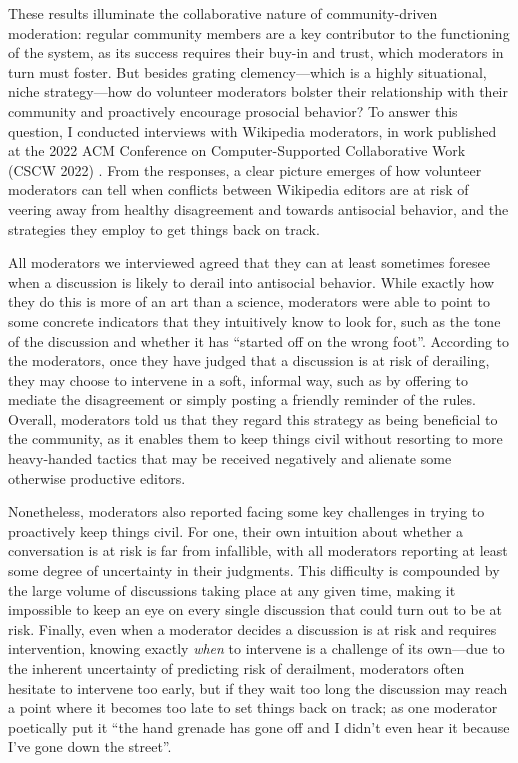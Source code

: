 \documentclass[11pt,letterpaper]{article}
\begin{document}
These results illuminate the collaborative nature of community-driven moderation: regular community members are a key contributor to the functioning of the system, as its success requires their buy-in and trust, which moderators in turn must foster.
But besides grating clemency---which is a highly situational, niche strategy---how do volunteer moderators bolster their relationship with their community and proactively encourage prosocial behavior?
To answer this question, I conducted interviews with Wikipedia moderators, in work published at the 2022 ACM Conference on Computer-Supported Collaborative Work (CSCW 2022) \cite{schluger_proactive_2022}.
From the responses, a clear picture emerges of how volunteer moderators can tell when conflicts between Wikipedia editors are at risk of veering away from healthy disagreement and towards antisocial behavior, and the strategies they employ to get things back on track.

All moderators we interviewed agreed that they can at least sometimes foresee when a discussion is likely to derail into antisocial behavior.
While exactly how they do this is more of an art than a science, moderators were able to point to some concrete indicators that they intuitively know to look for, such as the tone of the discussion and whether it has ``started off on the wrong foot''.
According to the moderators, once they have judged that a discussion is at risk of derailing, they may choose to intervene in a soft, informal way, such as by offering to mediate the disagreement or simply posting a friendly reminder of the rules.
Overall, moderators told us that they regard this strategy as being beneficial to the community, as it enables them to keep things civil without resorting to more heavy-handed tactics that may be received negatively and alienate some otherwise productive editors.

Nonetheless, moderators also reported facing some key challenges in trying to proactively keep things civil.
For one, their own intuition about whether a conversation is at risk is far from infallible, with all moderators reporting at least some degree of uncertainty in their judgments.
This difficulty is compounded by the large volume of discussions taking place at any given time, making it impossible to keep an eye on every single discussion that could turn out to be at risk.
Finally, even when a moderator decides a discussion is at risk and requires intervention, knowing exactly \emph{when} to intervene is a challenge of its own---due to the inherent uncertainty of predicting risk of derailment, moderators often hesitate to intervene too early, but if they wait too long the discussion may reach a point where it becomes too late to set things back on track; as one moderator poetically put it ``the hand grenade has gone off and I didn't even hear it because I've gone down the street''.
\end{document}
